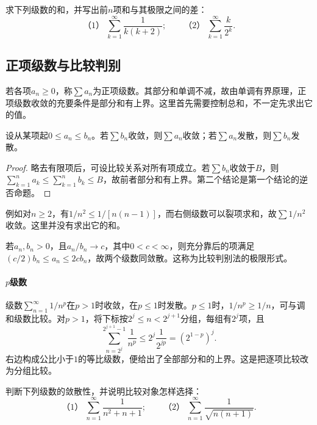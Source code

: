 \begin{example}
求下列级数的和，并写出前\(n\)项和与其极限之间的差：
\begin{equation*}
 \text{（1）}\ \sum_{k=1}^{\infty}\frac1{k(k+2)};
 \qquad
 \text{（2）}\ \sum_{k=1}^{\infty}\frac{k}{2^k}.
\end{equation*}
\end{example}

\subsection{正项级数与比较判别}

若各项\(a_n\ge0\)，称\(\sum a_n\)为{\heiti{}正项级数}。其部分和单调不减，故由单调有界原理，正项级数收敛的充要条件是部分和有上界。这里首先需要控制总和，不一定先求出它的值。

\begin{theorem}[比较判别法]
设从某项起\(0\le a_n\le b_n\)。若\(\sum b_n\)收敛，则\(\sum a_n\)收敛；若\(\sum a_n\)发散，则\(\sum b_n\)发散。
\end{theorem}

\begin{proof}
略去有限项后，可设比较关系对所有项成立。若\(\sum b_n\)收敛于\(B\)，则\(\sum_{k=1}^n a_k\le\sum_{k=1}^n b_k\le B\)，故前者部分和有上界。第二个结论是第一个结论的逆否命题。
\end{proof}

例如对\(n\ge2\)，有\(1/n^2\le1/[n(n-1)]\)，而右侧级数可以裂项求和，故\(\sum 1/n^2\)收敛。这里并没有求出它的和。

若\(a_n,b_n>0\)，且\(a_n/b_n\to c\)，其中\(0<c<\infty\)，则充分靠后的项满足\((c/2)b_n\le a_n\le2cb_n\)，故两个级数同敛散。这称为比较判别法的极限形式。

\paragraph{\texorpdfstring{\(p\)}{p}级数} \mbox{}

级数\(\sum_{n=1}^{\infty}1/n^p\)在\(p>1\)时收敛，在\(p\le1\)时发散。\(p\le1\)时，\(1/n^p\ge1/n\)，可与调和级数比较。对\(p>1\)，将下标按\(2^j\le n<2^{j+1}\)分组，每组有\(2^j\)项，且
\begin{equation*}
 \sum_{n=2^j}^{2^{j+1}-1}\frac1{n^p}
 \le 2^j\frac1{2^{jp}}=\left(2^{1-p}\right)^j.
\end{equation*}
右边构成公比小于\(1\)的等比级数，便给出了全部部分和的上界。这是把逐项比较改为分组比较。

\begin{example}
判断下列级数的敛散性，并说明比较对象怎样选择：
\begin{equation*}
 \text{（1）}\ \sum_{n=1}^{\infty}\frac1{n^2+n+1};
 \qquad
 \text{（2）}\ \sum_{n=1}^{\infty}\frac1{\sqrt{n(n+1)}}.
\end{equation*}
\end{example}

